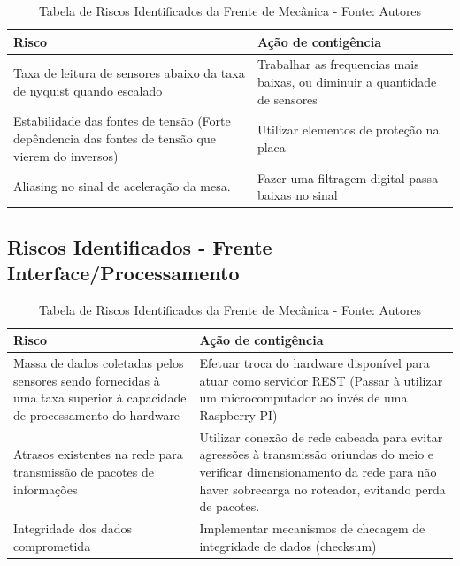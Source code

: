 \begin{table}[H]
    \begin{tabular}{|p{7cm}|p{7cm}|}
        \hline
        \textbf{Risco} & \textbf{Ação de contigência} \\ \hline
        Taxa de leitura de sensores abaixo da taxa de nyquist quando escalado & Trabalhar as frequencias mais baixas, ou diminuir a quantidade de sensores \\ \hline
        Estabilidade das fontes de tensão (Forte depêndencia das fontes de tensão que vierem do inversos) & Utilizar elementos de proteção na placa \\ \hline
        Aliasing no sinal de aceleração da mesa. & Fazer uma filtragem digital passa baixas no sinal \\ \hline
    \end{tabular}
    \caption{Tabela de Riscos Identificados da Frente de Mecânica - Fonte: Autores}
    \label{tab:tabela_riscos_mecanica}
\end{table}

\subsection*{Riscos Identificados - Frente Interface/Processamento}

\begin{table}[H]
    \begin{tabular}{|p{7cm}|p{7cm}|}
        \hline
        \textbf{Risco} & \textbf{Ação de contigência} \\ \hline
        Massa de dados coletadas pelos sensores sendo fornecidas à uma taxa superior à capacidade de processamento do hardware & Efetuar troca do hardware disponível para atuar como servidor REST (Passar à utilizar um microcomputador ao invés de uma Raspberry PI) \\ \hline
        Atrasos existentes na rede para transmissão de pacotes de informações & Utilizar conexão de rede cabeada para evitar agressões à transmissão oriundas do meio e verificar dimensionamento da rede para não haver sobrecarga no roteador, evitando perda de pacotes. \\ \hline
        Integridade dos dados comprometida & Implementar mecanismos de checagem de integridade de dados (checksum) \\ \hline
    \end{tabular}
    \caption{Tabela de Riscos Identificados da Frente de Mecânica - Fonte: Autores}
    \label{tab:tabela_riscos_mecanica}
\end{table}

